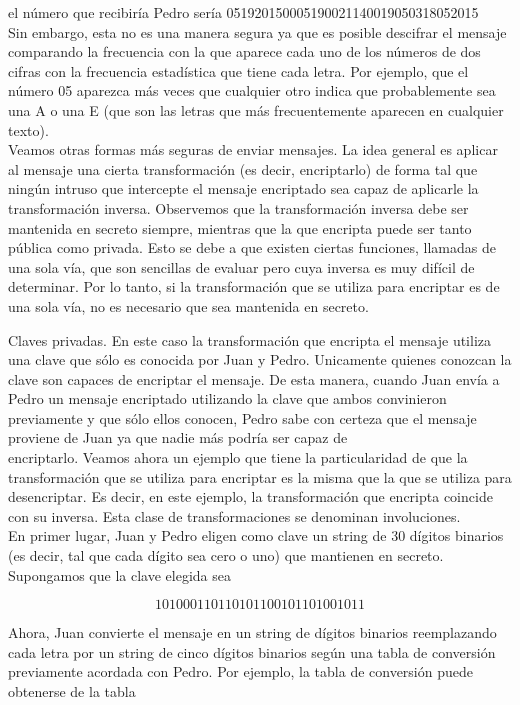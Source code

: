 \documentclass[10pt]{article}
\begin{document}
el número que recibiría Pedro sería 051920150005190021140019050318052015\\
Sin embargo, esta no es una manera segura ya que es posible descifrar el mensaje comparando la frecuencia con la que aparece cada uno de los números de dos cifras con la frecuencia estadística que tiene cada letra. Por ejemplo, que el número 05 aparezca más veces que cualquier otro indica que probablemente sea una A o una E (que son las letras que más frecuentemente aparecen en cualquier texto).\\
Veamos otras formas más seguras de enviar mensajes. La idea general es aplicar al mensaje una cierta transformación (es decir, encriptarlo) de forma tal que ningún intruso que intercepte el mensaje encriptado sea capaz de aplicarle la transformación inversa. Observemos que la transformación inversa debe ser mantenida en secreto siempre, mientras que la que encripta puede ser tanto pública como privada. Esto se debe a que existen ciertas funciones, llamadas de una sola vía, que son sencillas de evaluar pero cuya inversa es muy difícil de determinar. Por lo tanto, si la transformación que se utiliza para encriptar es de una sola vía, no es necesario que sea mantenida en secreto.

Claves privadas. En este caso la transformación que encripta el mensaje utiliza una clave que sólo es conocida por Juan y Pedro. Unicamente quienes conozcan la clave son capaces de encriptar el mensaje. De esta manera, cuando Juan envía a Pedro un mensaje encriptado utilizando la clave que ambos convinieron previamente y que sólo ellos conocen, Pedro sabe con certeza que el mensaje proviene de Juan ya que nadie más podría ser capaz de\\
encriptarlo. Veamos ahora un ejemplo que tiene la particularidad de que la transformación que se utiliza para encriptar es la misma que la que se utiliza para desencriptar. Es decir, en este ejemplo, la transformación que encripta coincide con su inversa. Esta clase de transformaciones se denominan involuciones.\\
En primer lugar, Juan y Pedro eligen como clave un string de 30 dígitos binarios (es decir, tal que cada dígito sea cero o uno) que mantienen en secreto. Supongamos que la clave elegida sea

$$
101000110110101100101101001011
$$

Ahora, Juan convierte el mensaje en un string de dígitos binarios reemplazando cada letra por un string de cinco dígitos binarios según una tabla de conversión previamente acordada con Pedro. Por ejemplo, la tabla de conversión puede obtenerse de la tabla
\end{document}
